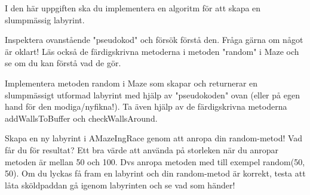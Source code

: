 \Task I den här uppgiften ska du implementera en algoritm för att skapa en slumpmässig labyrint.

\Subtask Inspektera ovanstående "pseudokod" och försök förstå den. Fråga gärna om något är oklart! Läs också de färdigskrivna metoderna i metoden "random" i Maze och se om du kan förstå vad de gör.

\Subtask Implementera metoden random i Maze som skapar och returnerar en slumpmässigt utformad labyrint med hjälp av "pseudokoden" ovan (eller på egen hand för den modiga/nyfikna!). Ta även hjälp av de färdigskrivna metoderna addWallsToBuffer och checkWallsAround.

\Subtask Skapa en ny labyrint i AMazeIngRace genom att anropa din random-metod! Vad får du för resultat? Ett bra värde att använda på storleken när du anropar metoden är mellan 50 och 100. Dvs anropa metoden med till exempel random(50, 50). Om du lyckas få fram en labyrint och din random-metod är korrekt, testa att låta sköldpaddan gå igenom labyrinten och se vad som händer!
    
